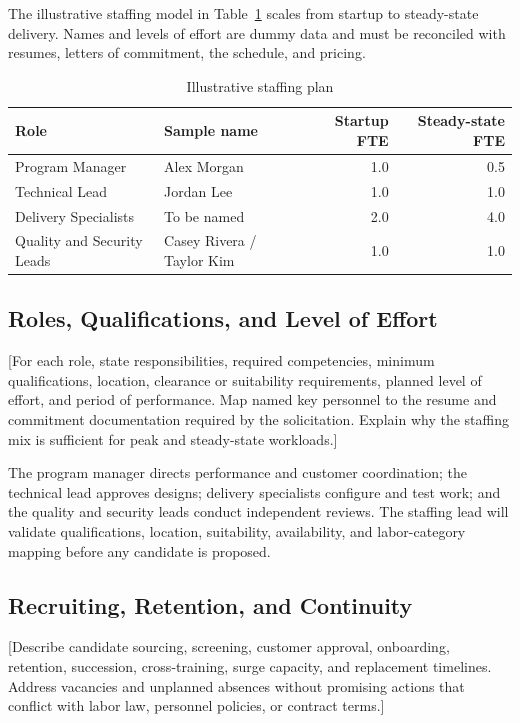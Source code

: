 The illustrative staffing model in Table~\ref{tab:staffing} scales from startup
to steady-state delivery. Names and levels of effort are dummy data and must be
reconciled with resumes, letters of commitment, the schedule, and pricing.

\begin{table}[htbp]
\centering
\caption{Illustrative staffing plan}
\label{tab:staffing}
\begin{tabularx}{\textwidth}{@{}Xlrr@{}}
\toprule
Role & Sample name & Startup FTE & Steady-state FTE \\
\midrule
Program Manager & Alex Morgan & 1.0 & 0.5 \\
Technical Lead & Jordan Lee & 1.0 & 1.0 \\
Delivery Specialists & To be named & 2.0 & 4.0 \\
Quality and Security Leads & Casey Rivera / Taylor Kim & 1.0 & 1.0 \\
\bottomrule
\end{tabularx}
\end{table}

\subsection{Roles, Qualifications, and Level of Effort}
[For each role, state responsibilities, required competencies, minimum
qualifications, location, clearance or suitability requirements, planned level
of effort, and period of performance. Map named key personnel to the resume
and commitment documentation required by the solicitation. Explain why the
staffing mix is sufficient for peak and steady-state workloads.]

The program manager directs performance and customer coordination; the
technical lead approves designs; delivery specialists configure and test work;
and the quality and security leads conduct independent reviews. The staffing
lead will validate qualifications, location, suitability, availability, and
labor-category mapping before any candidate is proposed.

\subsection{Recruiting, Retention, and Continuity}
[Describe candidate sourcing, screening, customer approval, onboarding,
retention, succession, cross-training, surge capacity, and replacement
timelines. Address vacancies and unplanned absences without promising actions
that conflict with labor law, personnel policies, or contract terms.]

